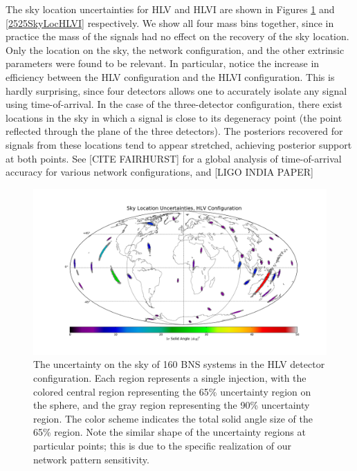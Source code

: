 \documentclass[11pt,a4paper]{emulateapj}
\newcommand{\carl}[1]{{\color{red}  #1}}
\begin{document}
The sky location uncertainties for HLV and HLVI are shown in Figures \ref{2525SkyLocHLV}
 and \ref{2525SkyLocHLVI} respectively.  We show all four mass bins together, since in practice
  the mass of the signals had no effect on the recovery of the sky location.  Only the location on 
  the sky, the network configuration, and the other extrinsic parameters were found to be relevant.  
  In particular, notice the increase in efficiency between the HLV configuration and the HLVI 
  configuration.  This is hardly surprising, since four detectors allows one to accurately isolate
   any signal using time-of-arrival.  In the case of the three-detector configuration, there exist locations 
   in the sky in which a signal is close to its degeneracy point (the point reflected through the plane
    of the three detectors).  The posteriors recovered for signals from these locations tend to appear
     stretched, achieving posterior support at both points.  See  \carl{[CITE FAIRHURST]} for a global 
     analysis of time-of-arrival accuracy for various network configurations, and \carl{[LIGO INDIA PAPER]} 



\begin{figure}[ht!]
  \centering
 \includegraphics[angle=0,scale=0.4, trim=5cm 2cm 3cm 0cm]{2p5_2p5_HLV.pdf}
 \caption{The uncertainty on the sky of 160 BNS systems in the HLV detector configuration.  Each region represents a single injection, with the colored central region representing the 65\% uncertainty region on the sphere, and the gray region representing the 90\% uncertainty region.  The color scheme indicates the total solid angle size of the 65\% region.  Note the similar shape of the uncertainty regions at particular points; this is due to the specific realization of our network pattern sensitivity.}
 \label{2525SkyLocHLV}
\end{figure}
\end{document}
